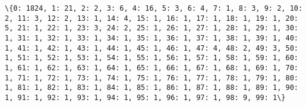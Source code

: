 \documentclass[11pt]{article}
\begin{document}
    \begin{Verbatim}[commandchars=\\\{\}]
\{0: 1824, 1: 21, 2: 2, 3: 6, 4: 16, 5: 3, 6: 4, 7: 1, 8: 3, 9: 2, 10: 2, 11: 3, 12: 2, 13: 1, 14: 4, 15: 1, 16: 1, 17: 1, 18: 1, 19: 1, 20: 5, 21: 1, 22: 1, 23: 3, 24: 2, 25: 1, 26: 1, 27: 1, 28: 1, 29: 1, 30: 1, 31: 1, 32: 1, 33: 1, 34: 1, 35: 1, 36: 1, 37: 1, 38: 1, 39: 1, 40: 1, 41: 1, 42: 1, 43: 1, 44: 1, 45: 1, 46: 1, 47: 4, 48: 2, 49: 3, 50: 1, 51: 1, 52: 1, 53: 1, 54: 1, 55: 1, 56: 1, 57: 1, 58: 1, 59: 1, 60: 1, 61: 1, 62: 1, 63: 1, 64: 1, 65: 1, 66: 1, 67: 1, 68: 1, 69: 1, 70: 1, 71: 1, 72: 1, 73: 1, 74: 1, 75: 1, 76: 1, 77: 1, 78: 1, 79: 1, 80: 1, 81: 1, 82: 1, 83: 1, 84: 1, 85: 1, 86: 1, 87: 1, 88: 1, 89: 1, 90: 1, 91: 1, 92: 1, 93: 1, 94: 1, 95: 1, 96: 1, 97: 1, 98: 9, 99: 1\}

    \end{Verbatim}
\end{document}
